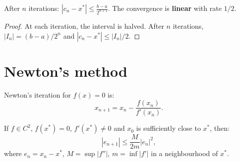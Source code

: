 \begin{theorem}
After $n$ iterations: $|c_n-x^*|\leq\frac{b-a}{2^{n+1}}$. The convergence is \textbf{linear} with rate $1/2$.
\end{theorem}

\begin{proof}
At each iteration, the interval is halved. After $n$ iterations, $|I_n|=(b-a)/2^n$ and $|c_n-x^*|\leq|I_n|/2$.
\end{proof}

\section{Newton's method}

\begin{definition}
Newton's iteration for $f(x)=0$ is:
\[
x_{n+1} = x_n - \frac{f(x_n)}{f'(x_n)}.
\]
\end{definition}

\begin{center}
\end{center}

\begin{algorithm}[H]
\caption{Newton's method}\label{alg:newton}
\end{algorithm}

\begin{theorem}\label{thm:newton-conv}
If $f\in C^2$, $f(x^*)=0$, $f'(x^*)\neq 0$ and $x_0$ is sufficiently close to $x^*$, then:
\[
|e_{n+1}| \leq \frac{M}{2m}|e_n|^2,
\]
where $e_n=x_n-x^*$, $M=\sup|f''|$, $m=\inf|f'|$ in a neighbourhood of $x^*$.
\end{theorem}

